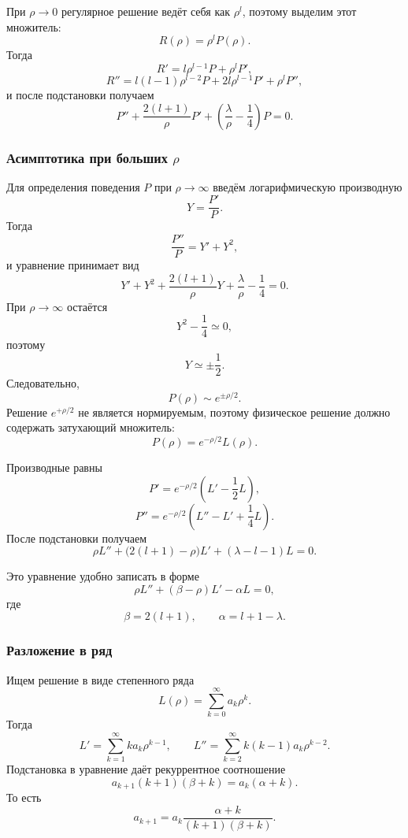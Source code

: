 \documentclass[12pt,a4paper]{article}
\begin{document}
При $\rho\to0$ регулярное решение ведёт себя как $\rho^l$, поэтому
выделим этот множитель:
\[
    R(\rho)=\rho^lP(\rho).
\]
Тогда
\[
    R'
    =
    l\rho^{l-1}P+\rho^lP',
\]
\[
    R''
    =
    l(l-1)\rho^{l-2}P
    +
    2l\rho^{l-1}P'
    +
    \rho^lP'',
\]
и после подстановки получаем
\[
    \boxed{
    P''
    +
    \frac{2(l+1)}{\rho}P'
    +
    \left(
        \frac{\lambda}{\rho}
        -
        \frac14
    \right)P
    =
    0
    }.
\]

\subsubsection{Асимптотика при больших \texorpdfstring{$\rho$}{rho}}

Для определения поведения $P$ при $\rho\to\infty$ введём
логарифмическую производную
\[
    Y=\frac{P'}{P}.
\]
Тогда
\[
    \frac{P''}{P}=Y'+Y^2,
\]
и уравнение принимает вид
\[
    Y'
    +
    Y^2
    +
    \frac{2(l+1)}{\rho}Y
    +
    \frac{\lambda}{\rho}
    -
    \frac14
    =
    0.
\]
При $\rho\to\infty$ остаётся
\[
    Y^2-\frac14\simeq0,
\]
поэтому
\[
    Y\simeq\pm\frac12.
\]
Следовательно,
\[
    P(\rho)\sim e^{\pm\rho/2}.
\]
Решение $e^{+\rho/2}$ не является нормируемым, поэтому физическое
решение должно содержать затухающий множитель:
\[
    \boxed{
        P(\rho)=e^{-\rho/2}L(\rho)
    }.
\]

Производные равны
\[
    P'
    =
    e^{-\rho/2}
    \left(
        L'-\frac12L
    \right),
\]
\[
    P''
    =
    e^{-\rho/2}
    \left(
        L''-L'+\frac14L
    \right).
\]
После подстановки получаем
\[
    \boxed{
        \rho L''
        +
        \bigl(2(l+1)-\rho\bigr)L'
        +
        (\lambda-l-1)L
        =
        0
    }.
\]

Это уравнение удобно записать в форме
\[
    \rho L''+(\beta-\rho)L'-\alpha L=0,
\]
где
\[
    \boxed{
        \beta=2(l+1),
        \qquad
        \alpha=l+1-\lambda
    }.
\]

\subsubsection{Разложение в ряд}

Ищем решение в виде степенного ряда
\[
    L(\rho)
    =
    \sum_{k=0}^{\infty}a_k\rho^k.
\]
Тогда
\[
    L'
    =
    \sum_{k=1}^{\infty}
        ka_k\rho^{k-1},
    \qquad
    L''
    =
    \sum_{k=2}^{\infty}
        k(k-1)a_k\rho^{k-2}.
\]
Подстановка в уравнение даёт рекуррентное соотношение
\[
    \boxed{
        a_{k+1}(k+1)(\beta+k)
        =
        a_k(\alpha+k)
    }.
\]
То есть
\[
    a_{k+1}
    =
    a_k
    \frac{\alpha+k}{(k+1)(\beta+k)}.
\]
\end{document}
